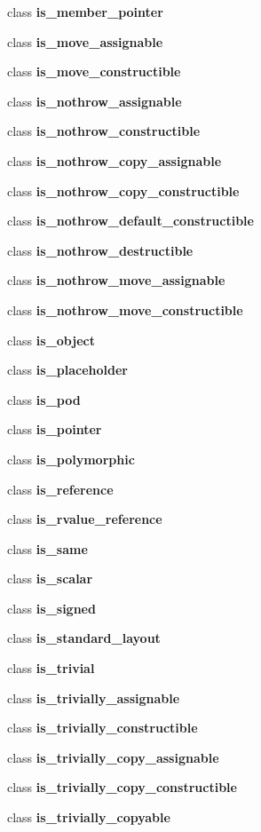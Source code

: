 \begin{DoxyCompactItemize}
\item 
class \textbf{ is\+\_\+member\+\_\+pointer}
\item 
class \textbf{ is\+\_\+move\+\_\+assignable}
\item 
class \textbf{ is\+\_\+move\+\_\+constructible}
\item 
class \textbf{ is\+\_\+nothrow\+\_\+assignable}
\item 
class \textbf{ is\+\_\+nothrow\+\_\+constructible}
\item 
class \textbf{ is\+\_\+nothrow\+\_\+copy\+\_\+assignable}
\item 
class \textbf{ is\+\_\+nothrow\+\_\+copy\+\_\+constructible}
\item 
class \textbf{ is\+\_\+nothrow\+\_\+default\+\_\+constructible}
\item 
class \textbf{ is\+\_\+nothrow\+\_\+destructible}
\item 
class \textbf{ is\+\_\+nothrow\+\_\+move\+\_\+assignable}
\item 
class \textbf{ is\+\_\+nothrow\+\_\+move\+\_\+constructible}
\item 
class \textbf{ is\+\_\+object}
\item 
class \textbf{ is\+\_\+placeholder}
\item 
class \textbf{ is\+\_\+pod}
\item 
class \textbf{ is\+\_\+pointer}
\item 
class \textbf{ is\+\_\+polymorphic}
\item 
class \textbf{ is\+\_\+reference}
\item 
class \textbf{ is\+\_\+rvalue\+\_\+reference}
\item 
class \textbf{ is\+\_\+same}
\item 
class \textbf{ is\+\_\+scalar}
\item 
class \textbf{ is\+\_\+signed}
\item 
class \textbf{ is\+\_\+standard\+\_\+layout}
\item 
class \textbf{ is\+\_\+trivial}
\item 
class \textbf{ is\+\_\+trivially\+\_\+assignable}
\item 
class \textbf{ is\+\_\+trivially\+\_\+constructible}
\item 
class \textbf{ is\+\_\+trivially\+\_\+copy\+\_\+assignable}
\item 
class \textbf{ is\+\_\+trivially\+\_\+copy\+\_\+constructible}
\item 
class \textbf{ is\+\_\+trivially\+\_\+copyable}
\item 

\end{DoxyCompactItemize}
